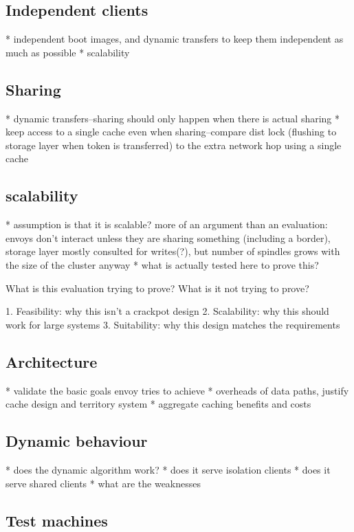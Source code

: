 \subsection{Independent clients}

* independent boot images, and dynamic transfers to keep them independent as much as possible
* scalability

\subsection{Sharing}

* dynamic transfers--sharing should only happen when there is actual sharing
* keep access to a single cache even when sharing--compare dist lock (flushing to storage layer when token is transferred) to the extra network hop using a single cache

\subsection{scalability}

* assumption is that it is scalable?  more of an argument than an evaluation: envoys don't interact unless they are sharing something (including a border), storage layer mostly consulted for writes(?), but number of spindles grows with the size of the cluster anyway
* what is actually tested here to prove this?




What is this evaluation trying to prove?  What is it not trying to prove?

1. Feasibility: why this isn't a crackpot design
2. Scalability: why this should work for large systems
3. Suitability: why this design matches the requirements

\subsection{Architecture}
* validate the basic goals envoy tries to achieve
* overheads of data paths, justify cache design and territory system
* aggregate caching benefits and costs

\subsection{Dynamic behaviour}
* does the dynamic algorithm work?
* does it serve isolation clients
* does it serve shared clients
* what are the weaknesses

\subsection{Test machines}

